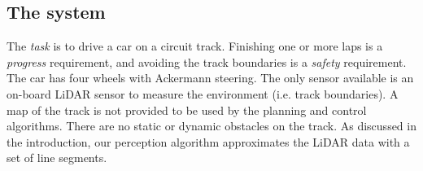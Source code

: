 \subsection{The system}
The \emph{task} is to drive a car on a circuit track.
%
Finishing one or more laps is a \emph{progress} requirement, and avoiding the track boundaries is a \emph{safety} requirement.
%
The car has four wheels with Ackermann steering.
%
The only sensor available is an on-board LiDAR sensor to measure the environment (i.e. track boundaries).
%
A map of the track is not provided to be used by the planning and control algorithms.
%
There are no static or dynamic obstacles on the track.
%
As discussed in the introduction, our perception algorithm approximates the LiDAR data with a set of line segments.



